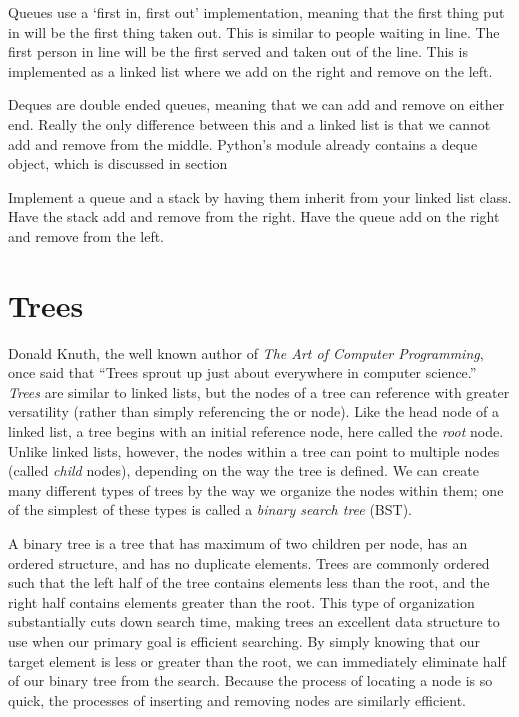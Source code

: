 Queues use a `first in, first out' implementation, meaning that the first thing put in will be the first thing taken out.
This is similar to people waiting in line.
The first person in line will be the first served and taken out of the line.
This is implemented as a linked list where we add on the right and remove on the left.

Deques are double ended queues, meaning that we can add and remove on either end.
Really the only difference between this and a linked list is that we cannot add and remove from the middle.
Python's  module already contains a deque object, which is discussed in section

\begin{problem}
Implement a queue and a stack by having them inherit from your linked list class.
Have the stack add and remove from the right.
Have the queue add on the right and remove from the left.
\label{prob:Stack}
\end{problem}



\section*{Trees}
\label{Binary Search Tree}
Donald Knuth, the well known author of \emph{The Art of Computer Programming}, once said that ``Trees sprout up just about everywhere in computer science.''
\emph{Trees} are similar to linked lists, but the nodes of a tree can reference with greater versatility (rather than simply referencing the  or  node).
Like the head node of a linked list, a tree begins with an initial reference node, here called the \emph{root} node.
Unlike linked lists, however, the nodes within a tree can point to multiple nodes (called \emph{child} nodes), depending on the way the tree is defined.
We can create many different types of trees by the way we organize the nodes within them; one of the simplest of these types is called a \emph{binary search tree} (BST).

A binary tree is a tree that has maximum of two children per node, has an ordered structure, and has no duplicate elements.
Trees are commonly ordered such that the left half of the tree contains elements less than the root, and the right half contains elements greater than the root.
This type of organization substantially cuts down search time, making trees an excellent data structure to use when our primary goal is efficient searching.
By simply knowing that our target element is less or greater than the root, we can immediately eliminate half of our binary tree from the search.
Because the process of locating a node is so quick, the processes of inserting and removing nodes are similarly efficient.

